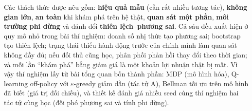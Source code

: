 Các thách thức được nêu gồm: \textbf{hiệu quả mẫu} (cần rất nhiều tương tác), \textbf{không gian lớn},
\textbf{an toàn} khi khám phá trên hệ thật, \textbf{quan sát một phần}, \textbf{môi trường phi dừng} và đánh đổi
\textbf{thiên lệch--phương sai}. Cả sáu đều xuất hiện ở quy mô nhỏ trong bài thí nghiệm: doanh số nhị thức tạo phương
sai; bootstrap tạo thiên lệch; trạng thái thiếu hành động trước của chính mình làm quan sát không đầy đủ; nếu đối thủ
cũng học, phân phối phản hồi thay đổi theo thời gian; và mỗi lần ``khám phá'' bằng giảm giá là một khoản lợi nhuận
thật bị mất. Vì vậy thí nghiệm lấy từ bài tổng quan bốn thành phần: MDP (mô hình hóa), Q-learning off-policy với
$\varepsilon$-greedy giảm dần (tác tử A), Bellman tối ưu trên mô hình đã biết (giá trị đối chiếu), và thiết kế
đánh giá nhiều seed cùng thí nghiệm hai tác tử cùng học (đối phó phương sai và tính phi dừng).
